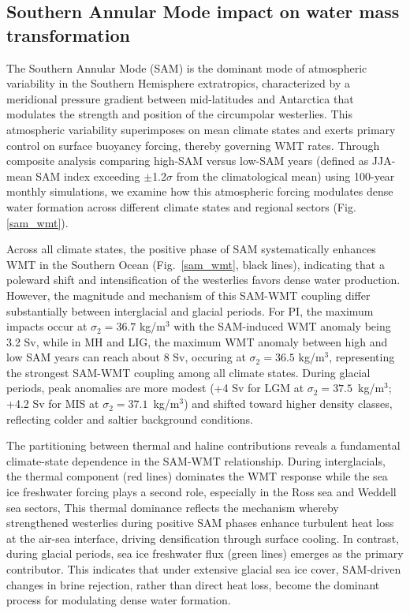 \documentclass[pdflatex,sn-nature]{sn-jnl}
\begin{document}
\subsection{Southern Annular Mode impact on water mass transformation}





The Southern Annular Mode (SAM) is the dominant mode of atmospheric variability in the Southern Hemisphere extratropics, characterized by a meridional pressure gradient between mid-latitudes and Antarctica that modulates the strength and position of the circumpolar westerlies. This atmospheric variability superimposes on mean climate states   and exerts primary control on surface buoyancy forcing, thereby governing WMT rates. Through composite analysis comparing high-SAM versus low-SAM years  (defined as JJA-mean SAM index exceeding $\pm$1.2$\sigma$ from the climatological mean)  using 100-year monthly simulations, we examine how this atmospheric forcing modulates   dense water formation across different climate states and regional sectors  (Fig. \ref{sam_wmt}).

Across all climate states, the positive phase of SAM systematically enhances WMT in the Southern Ocean (Fig.~\ref{sam_wmt}, black lines), indicating that a poleward shift and intensification of the westerlies favors dense water production. However, the magnitude and mechanism of this SAM-WMT coupling differ substantially between interglacial and glacial periods. For PI, the maximum impacts occur at $\sigma_2 = 36.7$ kg/m$^3$ with the SAM-induced WMT anomaly being 3.2 Sv,  while in MH and LIG, the maximum WMT anomaly between high and low SAM years can reach about 8 Sv, occuring at $\sigma_2 = 36.5$ kg/m$^3$, representing the strongest SAM-WMT coupling among all climate states. During glacial periods, peak anomalies are more modest (+4 Sv for LGM at $\sigma_2 = 37.5$~kg/m$^3$; +4.2 Sv for MIS at $\sigma_2 = 37.1$~kg/m$^3$) and shifted  toward higher density classes, reflecting colder and saltier background conditions.

The partitioning between thermal and haline contributions reveals a fundamental  climate-state dependence in the SAM-WMT relationship. During interglacials, the thermal component (red lines) dominates the WMT response while the sea ice freshwater forcing plays a second role, especially in the Ross sea and Weddell sea sectors,  This thermal dominance reflects the mechanism whereby strengthened westerlies during positive SAM phases enhance turbulent heat loss at the air-sea interface, driving densification through surface cooling. In contrast, during glacial periods, sea ice freshwater flux (green lines) emerges as the primary contributor. This indicates that under extensive glacial sea ice cover, SAM-driven changes in brine rejection, rather than direct heat loss, become the dominant process for modulating dense water formation.
\end{document}
